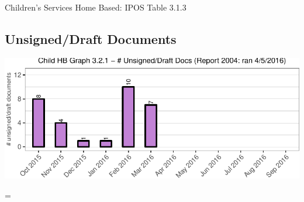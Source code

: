\documentclass{article}\usepackage[]{graphicx}\usepackage[]{color}
\makeatletter
\def\maxwidth{ %
  \ifdim\Gin@nat@width>\linewidth
    \linewidth
  \else
    \Gin@nat@width
  \fi
}
\newenvironment{knitrout}{}{} %
\newenvironment{absolutelynopagebreak}
  {\par\nobreak\vfil\penalty0\vfilneg
   \vtop\bgroup}
  {\par\xdef\tpd{\the\prevdepth}\egroup
   \prevdepth=\tpd}
\makeatother
\begin{document}
\begin{minipage}{\linewidth} { Children's Services Home Based: IPOS Table 3.1.3 \newline } %
 \par \bigskip \end{minipage}

\begin{absolutelynopagebreak}
\subsection{Unsigned/Draft Documents}
\begin{knitrout}
\color{fgcolor}
\includegraphics[width=\maxwidth]{figure/hb_p_unsign-1} 

\end{knitrout}
\end{absolutelynopagebreak}


\end{document}
